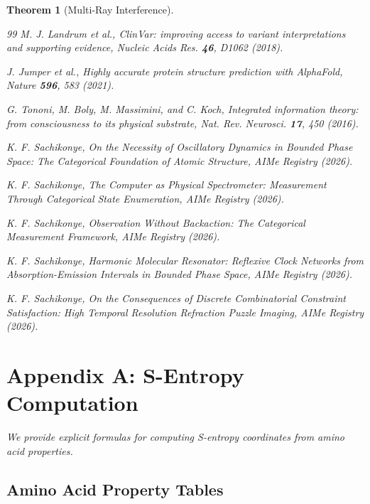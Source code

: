 \documentclass[11pt,a4paper]{article}
\newtheorem{theorem}{Theorem}[section]
\begin{document}
\begin{theorem}[Multi-Ray Interference]
\begin{thebibliography}{99}
M. J. Landrum et al.,
\textit{ClinVar: improving access to variant interpretations and supporting evidence},
Nucleic Acids Res. \textbf{46}, D1062 (2018).

J. Jumper et al.,
\textit{Highly accurate protein structure prediction with AlphaFold},
Nature \textbf{596}, 583 (2021).

G. Tononi, M. Boly, M. Massimini, and C. Koch,
\textit{Integrated information theory: from consciousness to its physical substrate},
Nat. Rev. Neurosci. \textbf{17}, 450 (2016).

K. F. Sachikonye,
\textit{On the Necessity of Oscillatory Dynamics in Bounded Phase Space: The Categorical Foundation of Atomic Structure},
AIMe Registry (2026).

K. F. Sachikonye,
\textit{The Computer as Physical Spectrometer: Measurement Through Categorical State Enumeration},
AIMe Registry (2026).

K. F. Sachikonye,
\textit{Observation Without Backaction: The Categorical Measurement Framework},
AIMe Registry (2026).

K. F. Sachikonye,
\textit{Harmonic Molecular Resonator: Reflexive Clock Networks from Absorption-Emission Intervals in Bounded Phase Space},
AIMe Registry (2026).

K. F. Sachikonye,
\textit{On the Consequences of Discrete Combinatorial Constraint Satisfaction: High Temporal Resolution Refraction Puzzle Imaging},
AIMe Registry (2026).

\end{thebibliography}

\appendix

\section{Appendix A: S-Entropy Computation}

We provide explicit formulas for computing S-entropy coordinates from amino acid properties.

\subsection{Amino Acid Property Tables}


\end{theorem}
\end{document}
